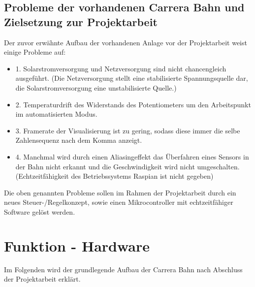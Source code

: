 \documentclass[a4paper, 11pt]{report}
\begin{document}
\section{Probleme der vorhandenen Carrera Bahn und Zielsetzung zur Projektarbeit}\label{sec:ziel}
Der zuvor erwähnte Aufbau der vorhandenen Anlage vor der Projektarbeit weist einige Probleme auf:
\begin{itemize}
	\item{1.} Solarstromversorgung und Netzversorgung sind nicht chancengleich ausgeführt. (Die Netzversorgung stellt eine stabilisierte Spannungsquelle dar, die Solarstromversorgung eine unstabilisierte Quelle.)
	\item{2.} Temperaturdrift des Widerstands des Potentiometers um den Arbeitspunkt im automatisierten Modus.
	\item{3.} Framerate der Visualisierung ist zu gering, sodass diese immer die selbe Zahlensequenz nach dem Komma anzeigt.
	\item{4.} Manchmal wird durch einen Aliasingeffekt das Überfahren eines Sensors in der Bahn nicht erkannt und die Geschwindigkeit wird nicht umgeschalten. (Echtzeitfähigkeit des Betriebssystems Raspian ist nicht gegeben)
\end{itemize}
Die oben genannten Probleme sollen im Rahmen der Projektarbeit durch ein neues Steuer-/Regelkonzept, sowie einen Mikrocontroller mit echtzeitfähiger Software gelöst werden.


\chapter{Funktion - Hardware}
	Im Folgenden wird der grundlegende Aufbau der Carrera Bahn nach Abschluss der Projektarbeit erklärt.
\end{document}
